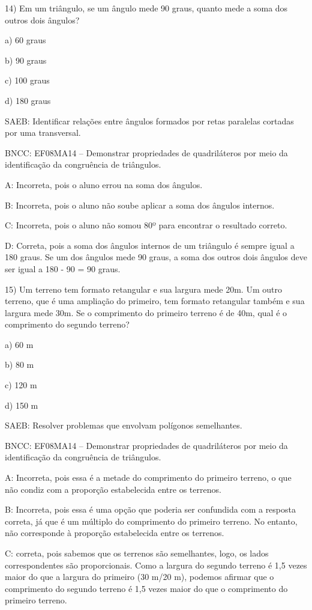 14) Em um triângulo, se um ângulo mede 90 graus, quanto mede a soma dos
outros dois ângulos?

a) 60 graus

b) 90 graus

c) 100 graus

d) 180 graus

SAEB: Identificar relações entre ângulos formados por retas paralelas
cortadas por uma transversal.

BNCC: EF08MA14 -- Demonstrar propriedades de quadriláteros por meio da
identificação da congruência de triângulos.

A: Incorreta, pois o aluno errou na soma dos ângulos.

B: Incorreta, pois o aluno não soube aplicar a soma dos ângulos
internos.

C: Incorreta, pois o aluno não somou 80º para encontrar o resultado
correto.

D: Correta, pois a soma dos ângulos internos de um triângulo é sempre
igual a 180 graus. Se um dos ângulos mede 90 graus, a soma dos outros
dois ângulos deve ser igual a 180 - 90 = 90 graus.

15) Um terreno tem formato retangular e sua largura mede 20m. Um outro
terreno, que é uma ampliação do primeiro, tem formato retangular também
e sua largura mede 30m. Se o comprimento do primeiro terreno é de 40m,
qual é o comprimento do segundo terreno?

a) 60 m

b) 80 m

c) 120 m

d) 150 m

SAEB: Resolver problemas que envolvam polígonos semelhantes.

BNCC: EF08MA14 -- Demonstrar propriedades de quadriláteros por meio da
identificação da congruência de triângulos.

A: Incorreta, pois essa é a metade do comprimento do primeiro terreno, o
que não condiz com a proporção estabelecida entre os terrenos.

B: Incorreta, pois essa é uma opção que poderia ser confundida com a
resposta correta, já que é um múltiplo do comprimento do primeiro
terreno. No entanto, não corresponde à proporção estabelecida entre os
terrenos.

C: correta, pois sabemos que os terrenos são semelhantes, logo, os lados
correspondentes são proporcionais. Como a largura do segundo terreno é
1,5 vezes maior do que a largura do primeiro (30 m/20 m), podemos
afirmar que o comprimento do segundo terreno é 1,5 vezes maior do que o
comprimento do primeiro terreno.

